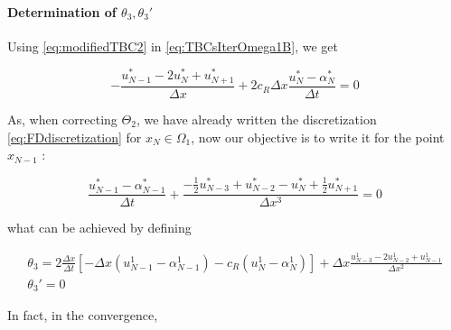 \paragraph{Determination of $\theta_3, \theta_3'$}

\indent Using \eqref{eq:modifiedTBC2} in \eqref{eq:TBCsIterOmega1B}, we get

\begin{equation*}
-\frac{u_{N-1}^* - 2 u_{N}^* + u_{N+1}^*}{\Delta x} + 2c_R\Delta x\frac{u_N^* - \alpha_N^*}{\Delta t} = 0 
\end{equation*}

\indent As, when correcting $\Theta_2$, we have already written the discretization \eqref{eq:FDdiscretization} for $x_N \in \Omega_1$, now our objective is to write it for the point $x_{N-1}$ :

\begin{equation*}
    \label{eq:FDdiscretizationNm1}
    \frac{u_{N-1}^* - \alpha_{N-1}^*}{\Delta t} + \frac{-\frac{1}{2}u_{N-3}^* + u_{N-2}^* - u_{N}^* + \frac{1}{2}u_{N+1}^* }{\Delta x ^3} = 0
\end{equation*}

\noindent what can be achieved by defining

\begin{equation*}
\begin{gathered}
    \theta_3 = 2\frac{\Delta x}{\Delta t} \left[-\Delta x(u_{N-1}^1 - \alpha_{N-1}^1) - c_R (u_N^1 - \alpha_N^1) \right] + \Delta x \frac{u_{N-3}^1 - 2u_{N-2}^1 + u_{N-1}^1}{\Delta x^2} \\
    \theta_3' = 0
\end{gathered}
\end{equation*}

\indent In fact, in the convergence,

